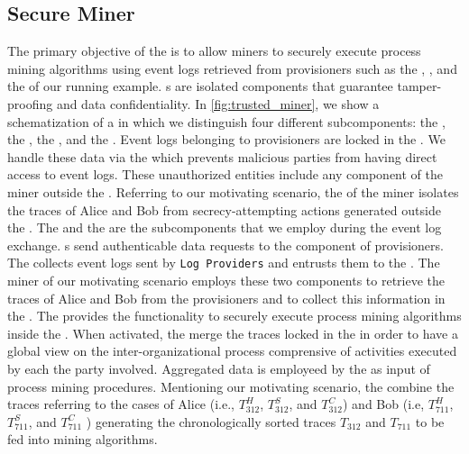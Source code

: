 \subsection{Secure Miner}
The primary objective of the  is to allow miners to securely execute process mining algorithms using event logs retrieved from provisioners such as the , , and the  of our running example. s are isolated components that guarantee tamper-proofing and data confidentiality. In \cref{fig:trusted_miner}, we show a schematization of a  in which we distinguish four different subcomponents: the , the , the , and the . Event logs belonging to provisioners are locked in the . We handle these data via the  which prevents malicious parties from having direct access to event logs. These unauthorized entities include any component of the miner  outside the . Referring to our motivating scenario, the  of the miner isolates the traces of Alice and Bob from secrecy-attempting actions generated outside the . %
The  and the  are the subcomponents that we employ during the event log exchange. s send authenticable data requests to the  component of provisioners. The  collects event logs sent by \texttt{Log Providers} and entrusts them to the . The miner of our motivating scenario employs these two components to retrieve the traces of Alice and Bob from the provisioners %
and to collect this information in the . The  provides the functionality to securely execute process mining algorithms inside the . When activated, the  merge the traces locked in the  in order to have a global view on the inter-organizational process comprensive of activities executed by each the party involved. Aggregated data is employeed by the  as input of process mining procedures. Mentioning our motivating scenario, the  combine the traces referring to the cases of Alice (i.e., $T^H_{312}$, $T^S_{312}$, and $T^C_{312}$) and Bob (i.e, $T^H_{711}$, $T^S_{711}$, and $T^C_{711}$ ) generating the chronologically sorted traces $T_{312}$ and $T_{711}$ to be fed into mining algorithms.  %



